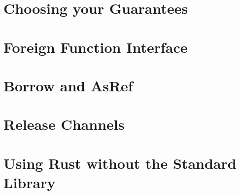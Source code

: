 \section{Choosing your Guarantees}
\label{sec:effective_choosingYourGuarantees}


\section{Foreign Function Interface}
\label{sec:effective_FFI}


\section{Borrow and AsRef}
\label{sec:effective_borrowAndAsRef}


\section{Release Channels}
\label{sec:effective_releaseChannels}


\section{Using Rust without the Standard Library}
\label{sec:effective_rustWithoutStdLib}

